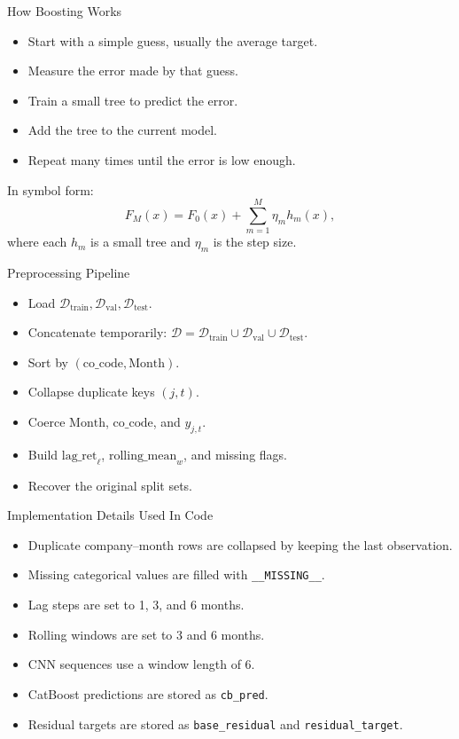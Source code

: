\documentclass[aspectratio=169]{beamer}
\newcommand{\D}{\mathcal{D}}
\begin{document}
\begin{frame}{How Boosting Works}
  \begin{itemize}
    \item Start with a simple guess, usually the average target.
    \item Measure the error made by that guess.
    \item Train a small tree to predict the error.
    \item Add the tree to the current model.
    \item Repeat many times until the error is low enough.
  \end{itemize}

  In symbol form:
  \[
    F_M(x) = F_0(x) + \sum_{m=1}^{M} \eta_m h_m(x),
  \]
  where each $h_m$ is a small tree and $\eta_m$ is the step size.
\end{frame}

\begin{frame}{Preprocessing Pipeline}
  \begin{itemize}
    \item Load $\D_{\mathrm{train}},\D_{\mathrm{val}},\D_{\mathrm{test}}$.
    \item Concatenate temporarily: $\D = \D_{\mathrm{train}} \cup \D_{
    \mathrm{val}} \cup \D_{\mathrm{test}}$.
    \item Sort by $(\mathrm{co\_code}, \mathrm{Month})$.
    \item Collapse duplicate keys $(j,t)$.
    \item Coerce $\mathrm{Month}$, $\mathrm{co\_code}$, and $y_{j,t}$.
    \item Build $\mathrm{lag\_ret}_\ell$, $\mathrm{rolling\_mean}_w$, and missing flags.
    \item Recover the original split sets.
  \end{itemize}
\end{frame}

\begin{frame}{Implementation Details Used In Code}
  \begin{itemize}
    \item Duplicate company--month rows are collapsed by keeping the last observation.
    \item Missing categorical values are filled with \texttt{\_\_MISSING\_\_}.
    \item Lag steps are set to 1, 3, and 6 months.
    \item Rolling windows are set to 3 and 6 months.
    \item CNN sequences use a window length of 6.
    \item CatBoost predictions are stored as \texttt{cb\_pred}.
    \item Residual targets are stored as \texttt{base\_residual} and \texttt{residual\_target}.
  \end{itemize}
\end{frame}
\end{document}
